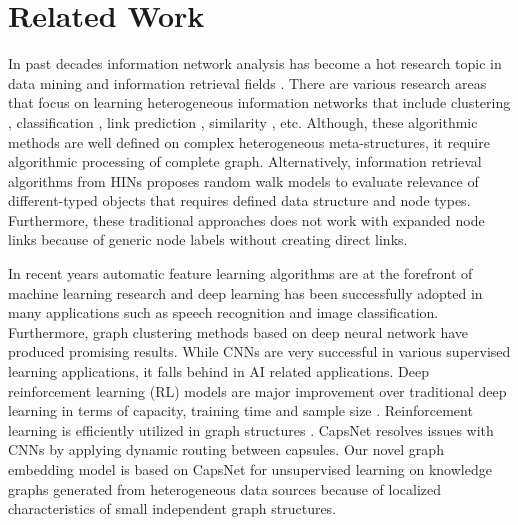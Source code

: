 \section{Related Work}
In past decades information network analysis has become a hot research topic in data mining and information retrieval fields \cite{shi2017survey}. There are various research areas that focus on learning heterogeneous information networks that include clustering \cite{huang2016meta}, classification \cite{kong2012meta}, link prediction \cite{zhang2017link}, similarity \cite{sun2011pathsim}, etc. Although, these algorithmic methods are well defined on complex heterogeneous meta-structures, it require algorithmic processing of complete graph. Alternatively, information retrieval algorithms from HINs proposes random walk models to evaluate relevance of different-typed objects that requires defined data structure and node types. Furthermore, these traditional approaches does not work with expanded node links because of generic node labels without creating direct links.

In recent years automatic feature learning algorithms are at the forefront of machine learning research and deep learning has been successfully adopted in many applications such as speech recognition and image classification. Furthermore, graph clustering methods based on deep neural network \cite{tian2014learning} have produced promising results. While CNNs are very successful in various supervised learning applications, it falls behind in AI related applications. Deep reinforcement learning (RL) models are major improvement over traditional deep learning in terms of capacity, training time and sample size \cite{zambaldi2018relational}. Reinforcement learning is efficiently utilized in graph structures \cite{liang2017deep}. CapsNet resolves issues with CNNs by applying dynamic routing between capsules. Our novel graph embedding model is based on CapsNet for unsupervised learning on knowledge graphs generated from heterogeneous data sources because of localized characteristics of small independent graph structures.